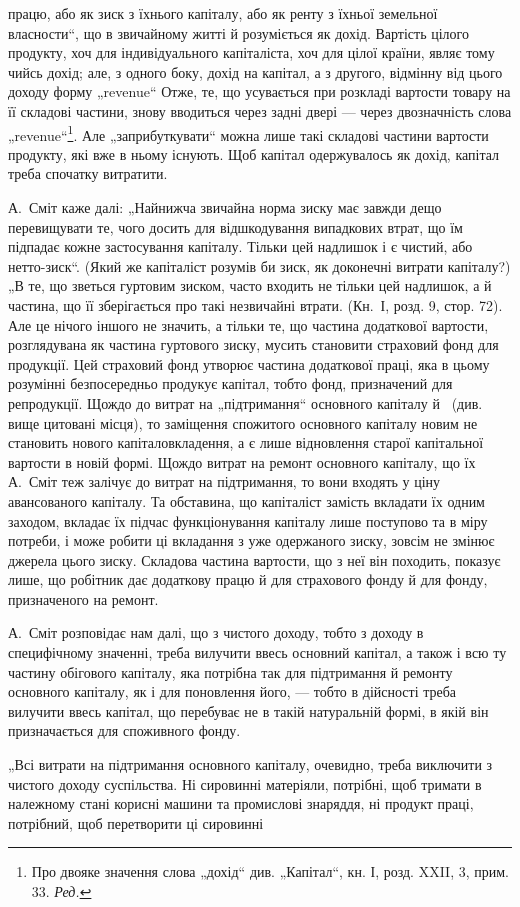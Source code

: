 \parcont{}  %
працю, або як зиск з їхнього капіталу, або як ренту з їхньої земельної
власности“, що в звичайному житті й розуміється як дохід. Вартість
цілого продукту, хоч для індивідуального капіталіста, хоч для цілої країни,
являє тому чийсь дохід; але, з одного боку, дохід на капітал, а з другого,
відмінну від цього доходу форму „revenue“ Отже, те, що усувається при
розкладі вартости товару на її складові частини, знову вводиться через
задні двері — через двозначність слова „revenue“\footnote*{
Про двояке значення слова „дохід“ див. „Капітал“, кн. І, розд. XXII, 3,
прим. 33. \emph{Ред.}
}. Але „заприбуткувати“
можна лише такі складові частини вартости продукту, які вже в ньому
існують. Щоб капітал одержувалось як дохід, капітал треба спочатку
витратити.

А.~Сміт каже далі: „Найнижча звичайна норма зиску має завжди
дещо перевищувати те, чого досить для відшкодування випадкових втрат,
що їм підпадає кожне застосування капіталу. Тільки цей надлишок і є
чистий, або нетто-зиск“. (Який же капіталіст розумів би зиск, як
доконечні витрати капіталу?) „В те, що зветься гуртовим зиском, часто
входить не тільки цей надлишок, а й частина, що її зберігається про
такі незвичайні втрати. (Кн.~І, розд. 9, стор. 72). Але це нічого іншого
не значить, а тільки те, що частина додаткової вартости, розглядувана
як частина гуртового зиску, мусить становити страховий фонд для продукції.
Цей страховий фонд утворює частина додаткової праці, яка в
цьому розумінні безпосередньо продукує капітал, тобто фонд, призначений
для репродукції. Щождо до витрат на „підтримання“ основного
капіталу й~ (див. вище цитовані місця), то заміщення спожитого
основного капіталу новим не становить нового капіталовкладення, а є
лише відновлення старої капітальної вартости в новій формі. Щождо
витрат на ремонт основного капіталу, що їх А.~Сміт теж залічує до витрат
на підтримання, то вони входять у ціну авансованого капіталу.
Та обставина, що капіталіст замість вкладати їх одним заходом, вкладає
їх підчас функціонування капіталу лише поступово та в міру потреби,
і може робити ці вкладання з уже одержаного зиску, зовсім не змінює
джерела цього зиску. Складова частина вартости, що з неї він походить,
показує лише, що робітник дає додаткову працю й для страхового фонду
й для фонду, призначеного на ремонт.

А.~Сміт розповідає нам далі, що з чистого доходу, тобто з доходу в
специфічному значенні, треба вилучити ввесь основний капітал, а також і
всю ту частину обігового капіталу, яка потрібна так для підтримання й
ремонту основного капіталу, як і для поновлення його, — тобто в дійсності
треба вилучити ввесь капітал, що перебуває не в такій натуральній
формі, в якій він призначається для споживного фонду.

„Всі витрати на підтримання основного капіталу, очевидно, треба
виключити з чистого доходу суспільства. Ні сировинні матеріяли, потрібні,
щоб тримати в належному стані корисні машини та промислові
знаряддя, ні продукт праці, потрібний, щоб перетворити ці сировинні
\parbreak{}  %
